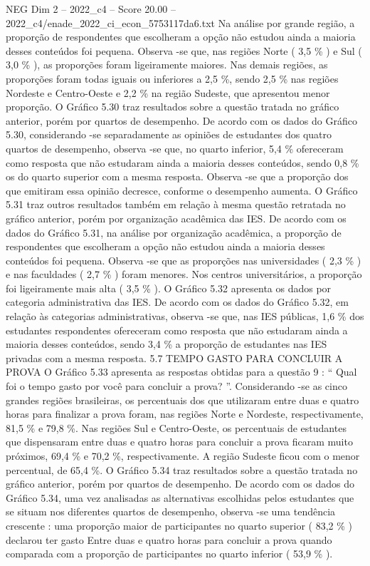\begin{textsample}{NEG Dim 2 – 2022\_c4 – Score 20.00 – 2022\_c4/enade\_2022\_ci\_econ\_5753117da6.txt}
Na análise por grande região, a proporção de respondentes que escolheram a opção não estudou ainda a maioria desses conteúdos foi pequena.
Observa -se que, nas regiões Norte ( 3,5 \% ) e Sul ( 3,0 \% ), as proporções foram ligeiramente maiores.
Nas demais regiões, as proporções foram todas iguais ou inferiores a 2,5 \%, sendo 2,5 \% nas regiões Nordeste e Centro-Oeste e 2,2 \% na região Sudeste, que apresentou menor proporção.
O Gráfico 5.30 traz resultados sobre a questão tratada no gráfico anterior, porém por quartos de desempenho.
De acordo com os dados do Gráfico 5.30, considerando -se separadamente as opiniões de estudantes dos quatro quartos de desempenho, observa -se que, no quarto inferior, 5,4 \% ofereceram como resposta que não estudaram ainda a maioria desses conteúdos, sendo 0,8 \% os do quarto superior com a mesma resposta.
Observa -se que a proporção dos que emitiram essa opinião decresce, conforme o desempenho aumenta.
O Gráfico 5.31 traz outros resultados também em relação à mesma questão retratada no gráfico anterior, porém por organização acadêmica das IES.
De acordo com os dados do Gráfico 5.31, na análise por organização acadêmica, a proporção de respondentes que escolheram a opção não estudou ainda a maioria desses conteúdos foi pequena.
Observa -se que as proporções nas universidades ( 2,3 \% ) e nas faculdades ( 2,7 \% ) foram menores.
Nos centros universitários, a proporção foi ligeiramente mais alta ( 3,5 \% ).
O Gráfico 5.32 apresenta os dados por categoria administrativa das IES.
De acordo com os dados do Gráfico 5.32, em relação às categorias administrativas, observa -se que, nas IES públicas, 1,6 \% dos estudantes respondentes ofereceram como resposta que não estudaram ainda a maioria desses conteúdos, sendo 3,4 \% a proporção de estudantes nas IES privadas com a mesma resposta. 5.7 TEMPO GASTO PARA CONCLUIR A PROVA O Gráfico 5.33 apresenta as respostas obtidas para a questão 9 : “ Qual foi o tempo gasto por você para concluir a prova? ”.
Considerando -se as cinco grandes regiões brasileiras, os percentuais dos que utilizaram entre duas e quatro horas para finalizar a prova foram, nas regiões Norte e Nordeste, respectivamente, 81,5 \% e 79,8 \%.
Nas regiões Sul e Centro-Oeste, os percentuais de estudantes que dispensaram entre duas e quatro horas para concluir a prova ficaram muito próximos, 69,4 \% e 70,2 \%, respectivamente.
A região Sudeste ficou com o menor percentual, de 65,4 \%.
O Gráfico 5.34 traz resultados sobre a questão tratada no gráfico anterior, porém por quartos de desempenho.
De acordo com os dados do Gráfico 5.34, uma vez analisadas as alternativas escolhidas pelos estudantes que se situam nos diferentes quartos de desempenho, observa -se uma tendência crescente : uma proporção maior de participantes no quarto superior ( 83,2 \% ) declarou ter gasto Entre duas e quatro horas para concluir a prova quando comparada com a proporção de participantes no quarto inferior ( 53,9 \% ).

\end{textsample}
